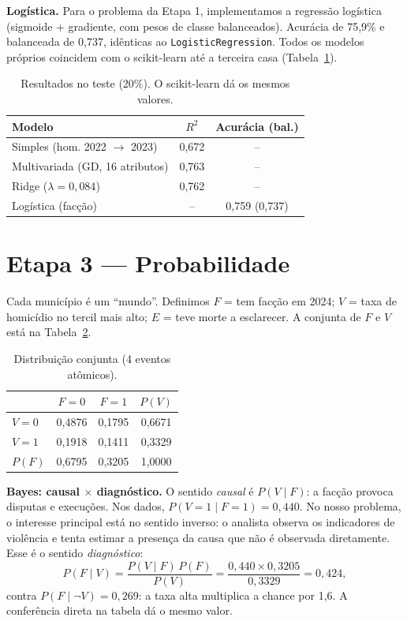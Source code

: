 \documentclass[10pt,a4paper,twocolumn]{article}
\begin{document}
\textbf{Logística.} Para o problema da Etapa 1, implementamos a regressão logística (sigmoide +
gradiente, com pesos de classe balanceados). Acurácia de 75,9\% e balanceada de 0,737, idênticas
ao \texttt{LogisticRegression}. Todos os modelos próprios coincidem com o scikit-learn até a
terceira casa (Tabela~\ref{tab:linear}).

\begin{table}[H]\centering\small
\begin{tabular}{lcc}\toprule
Modelo & $R^2$ & Acurácia (bal.)\\\midrule
Simples (hom. 2022 $\to$ 2023) & 0,672 & --\\
Multivariada (GD, 16 atributos) & 0,763 & --\\
Ridge ($\lambda=0{,}084$) & 0,762 & --\\
Logística (facção) & -- & 0,759 (0,737)\\\bottomrule
\end{tabular}\caption{Resultados no teste (20\%). O scikit-learn dá os mesmos valores.}\label{tab:linear}\end{table}

\section{Etapa 3 --- Probabilidade}
Cada município é um ``mundo''. Definimos $F$ = tem facção em 2024; $V$ = taxa de homicídio no
tercil mais alto; $E$ = teve morte a esclarecer. A conjunta de $F$ e $V$ está na Tabela~\ref{tab:conj}.

\begin{table}[H]\centering\small
\begin{tabular}{lccc}\toprule
& $F=0$ & $F=1$ & $P(V)$\\\midrule
$V=0$ & 0,4876 & 0,1795 & 0,6671\\
$V=1$ & 0,1918 & 0,1411 & 0,3329\\\midrule
$P(F)$ & 0,6795 & 0,3205 & 1,0000\\\bottomrule
\end{tabular}\caption{Distribuição conjunta (4 eventos atômicos).}\label{tab:conj}\end{table}

\textbf{Bayes: causal $\times$ diagnóstico.} O sentido \emph{causal} é $P(V\mid F)$: a facção
provoca disputas e execuções. Nos dados, $P(V{=}1\mid F{=}1)=0{,}440$. No nosso problema, o interesse principal está no sentido inverso: o analista observa os indicadores de violência e tenta estimar a presença da causa que não é observada diretamente. Esse é o sentido \emph{diagnóstico}:
\[
P(F\mid V)=\frac{P(V\mid F)\,P(F)}{P(V)}=\frac{0{,}440\times0{,}3205}{0{,}3329}=0{,}424,
\]
contra $P(F\mid\neg V)=0{,}269$: a taxa alta multiplica a chance por 1,6. A conferência direta na
tabela dá o mesmo valor.
\end{document}
